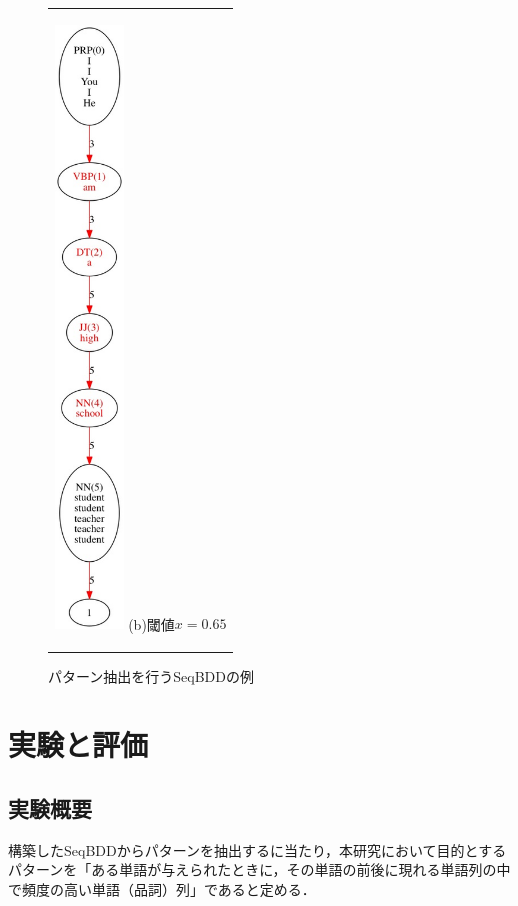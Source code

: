 \documentclass[12pt,twoside, fleqn]{ujbook}
\begin{document}
\begin{figure}[htbp]
\begin{center}
\begin{tabular}{c}
		\begin{minipage}{0.5\hsize}
			\begin{center}
			\includegraphics [clip, height=16cm]{./img/pattern_test2.jpeg}
			\hspace{1.6cm} (b)閾値$x=0.65$
			\end{center}
		\end{minipage}
	\end{tabular}
	\caption{パターン抽出を行うSeqBDDの例}
	\label{fig:seq_get_pattern}
	\end{center}
	\end{figure}


\chapter{実験と評価}
\label{text:jikken_hyouka}
\section{実験概要}
構築したSeqBDDからパターンを抽出するに当たり，本研究において目的とするパターンを「ある単語が与えられたときに，その単語の前後に現れる単語列の中で頻度の高い単語（品詞）列」であると定める．
\end{document}
